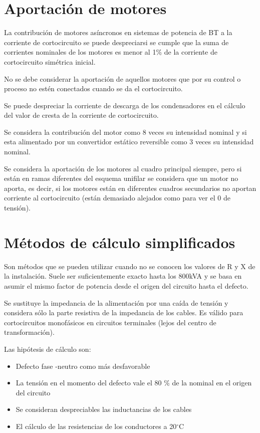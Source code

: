 \section{Aportación de motores}
La contribución de motores asíncronos en sistemas de potencia de BT a la corriente de cortocircuito se puede despreciarsi se cumple que la suma de corrientes nominales de los motores es menor al 1\% de la corriente de cortocircuito simétrica inicial.
\newline

No se debe considerar la aportación de aquellos motores que por su control o proceso no estén conectados cuando se da el cortocircuito. 
\newline

Se puede despreciar la corriente de descarga de los condensadores en el cálculo del valor de cresta de la corriente de cortocircuito.
\newline

Se considera la contribución del motor como 8 veces su intensidad nominal y si esta alimentado por un convertidor estático reversible como 3 veces su intensidad nominal. 
\newline

Se considera la aportación de los motores al cuadro principal siempre, pero si están en ramas diferentes del esquema unifilar se considera que un motor no aporta, es decir, si los motores están en diferentes cuadros secundarios no aportan corriente al cortocircuito (están demasiado alejados como para ver el 0 de tensión).
\section{Métodos de cálculo simplificados}
Son métodos que se pueden utilizar cuando no se conocen los valores de R y X de la instalación. Suele ser suficientemente exacto hasta los 800kVA y se basa en asumir el mismo factor de potencia desde el origen del circuito hasta el defecto.
\newline

Se sustituye la impedancia de la alimentación por una caída de tensión y considera sólo la parte resistiva de la impedancia de los cables. Es válido para cortocircuitos monofásicos en circuitos terminales (lejos del centro de transformación).
\newline

Las hipótesis de cálculo son:
\begin{itemize}
	\item Defecto fase -neutro como más desfavorable
	\item La tensión en el momento del defecto vale el 80 \% de la nominal en el origen del circuito
	\item Se consideran despreciables las inductancias de los cables
	\item El cálculo de las resistencias de los conductores a 20$^\circ$C
\end{itemize}